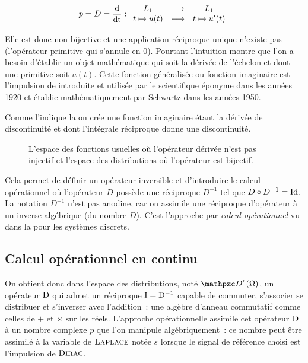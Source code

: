 \begin{equation}
  \label{eq:application_derivee}
  p=D=\frac{\mathrm{d{}}}{\mathrm{d{t}}} : \begin{array}{ccc} L_1 & \longrightarrow & L_1 \\ t\mapsto u(t) & \longmapsto & t\mapsto u'(t) \\ \end{array}
\end{equation}


Elle est donc non bijective et une application réciproque unique
n'existe pas (l'opérateur primitive qui s'annule en 0). Pourtant
l'intuition montre que l'on a besoin d'établir un objet mathématique
qui soit la dérivée de l'échelon et dont une primitive soit
$u(t)$. Cette fonction généralisée ou fonction imaginaire est
l'impulsion de \Dirac{} introduite et utilisée par le scientifique
éponyme dans les années 1920 et établie mathématiquement par Schwartz
dans les années 1950.

Comme l'indique la  on crée une
fonction imaginaire étant la dérivée de discontinuité et dont
l'intégrale réciproque donne une discontinuité.
\begin{figure}[ht!]
  \centering {}
  \caption{L'espace des fonctions usuelles où l'opérateur dérivée
    n'est pas injectif et l'espace des distributions où l'opérateur
    est bijectif. }
  \label{fig:fonctions_et_distributions}
\end{figure}


Cela permet de définir un opérateur inversible et d'introduire le
calcul opérationnel où l'opérateur $D$ possède une réciproque $D^{-1}$
tel que $D\circ D^{-1}=\mathrm{Id}$. La notation $D^{-1}$ n'est pas anodine, 
car on assimile une réciproque d'opérateur à un inverse algébrique (du
nombre $D$). C'est l'approche par \emph{calcul opérationnel} vu dans
la  pour les systèmes discrets.

\subsection{Calcul opérationnel en continu}
On obtient donc dans l'espace des distributions, noté $\Dis$, un
opérateur $\mathrm{D}$ qui admet un réciproque $\mathrm{I}=\mathrm{D}^{-1}$ capable de
commuter, s'associer se distribuer et s'inverser avec l'addition~: une
algèbre d'anneau commutatif comme celles de $+$ et $\times$ sur les
réels. L'approche opérationnelle assimile cet opérateur $\mathrm{D}$ à un
nombre complexe $p$ que l'on manipule algébriquement~: ce nombre peut
être assimilé à la variable de $\textsc{Laplace}$ notée $s$ lorsque le signal
de référence choisi est l'impulsion de $\textsc{Dirac}$.

